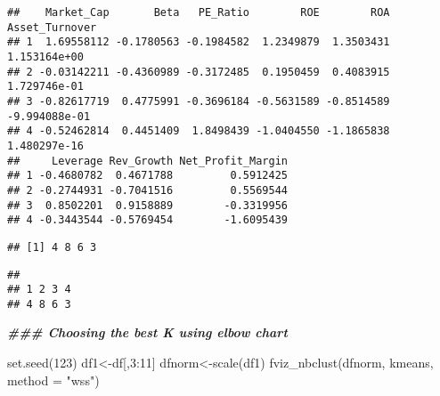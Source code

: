 \documentclass[
]{article}
\newenvironment{Shaded}{\begin{snugshade}}{\end{snugshade}}
\newcommand{\AttributeTok}[1]{\textcolor[rgb]{0.77,0.63,0.00}{#1}}
\newcommand{\DecValTok}[1]{\textcolor[rgb]{0.00,0.00,0.81}{#1}}
\newcommand{\DocumentationTok}[1]{\textcolor[rgb]{0.56,0.35,0.01}{\textbf{\textit{#1}}}}
\newcommand{\FunctionTok}[1]{\textcolor[rgb]{0.00,0.00,0.00}{#1}}
\newcommand{\NormalTok}[1]{#1}
\newcommand{\OtherTok}[1]{\textcolor[rgb]{0.56,0.35,0.01}{#1}}
\newcommand{\SpecialCharTok}[1]{\textcolor[rgb]{0.00,0.00,0.00}{#1}}
\newcommand{\StringTok}[1]{\textcolor[rgb]{0.31,0.60,0.02}{#1}}
\begin{document}
\begin{Shaded}
\end{Shaded}

\begin{verbatim}
##    Market_Cap       Beta   PE_Ratio        ROE        ROA Asset_Turnover
## 1  1.69558112 -0.1780563 -0.1984582  1.2349879  1.3503431   1.153164e+00
## 2 -0.03142211 -0.4360989 -0.3172485  0.1950459  0.4083915   1.729746e-01
## 3 -0.82617719  0.4775991 -0.3696184 -0.5631589 -0.8514589  -9.994088e-01
## 4 -0.52462814  0.4451409  1.8498439 -1.0404550 -1.1865838   1.480297e-16
##     Leverage Rev_Growth Net_Profit_Margin
## 1 -0.4680782  0.4671788         0.5912425
## 2 -0.2744931 -0.7041516         0.5569544
## 3  0.8502201  0.9158889        -0.3319956
## 4 -0.3443544 -0.5769454        -1.6095439
\end{verbatim}

\begin{Shaded}
\end{Shaded}

\begin{verbatim}
## [1] 4 8 6 3
\end{verbatim}

\begin{Shaded}
\end{Shaded}

\begin{verbatim}
## 
## 1 2 3 4 
## 4 8 6 3
\end{verbatim}

\begin{Shaded}
\begin{Highlighting}[]
\DocumentationTok{\#\#\# Choosing the best K using elbow chart}

\FunctionTok{set.seed}\NormalTok{(}\DecValTok{123}\NormalTok{)}
\NormalTok{df1}\OtherTok{\textless{}{-}}\NormalTok{df[,}\DecValTok{3}\SpecialCharTok{:}\DecValTok{11}\NormalTok{]}
\NormalTok{dfnorm}\OtherTok{\textless{}{-}}\FunctionTok{scale}\NormalTok{(df1)}
\FunctionTok{fviz\_nbclust}\NormalTok{(dfnorm, kmeans, }\AttributeTok{method =} \StringTok{"wss"}\NormalTok{)}
\end{Highlighting}
\end{Shaded}
\end{document}
